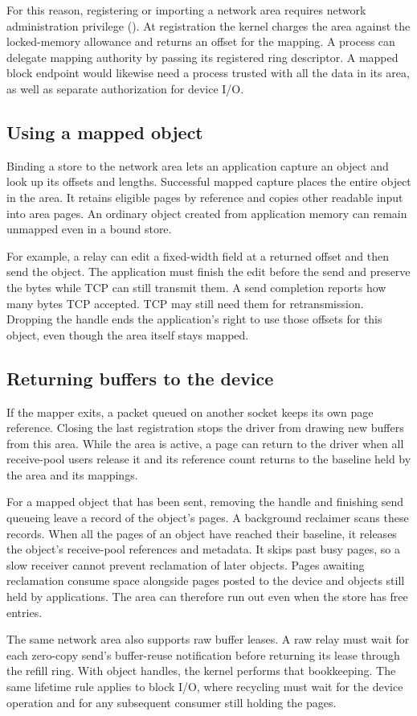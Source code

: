 For this reason, registering or importing a network area requires network
administration privilege (\capnetadmin). At registration the kernel charges the
area against the locked-memory allowance and returns an offset for the mapping.
A process can delegate mapping authority by passing its registered ring
descriptor. A mapped block endpoint would likewise need a process trusted
with all the data in its area, as well as separate authorization for device I/O.

\subsection{Using a mapped object}
\label{sec:mapped:objects}

Binding a store to the network area lets an application capture an object
and look up its offsets and lengths. Successful mapped capture places the
entire object in the area. It retains eligible pages by reference and copies
other readable input into area pages. An ordinary object created from
application memory can remain unmapped even in a bound store.

For example, a relay can edit a fixed-width field at a returned offset and
then send the object. The application must finish the edit before the send
and preserve the bytes while TCP can still transmit them. A send completion
reports how many bytes TCP accepted. TCP may still need them for
retransmission. Dropping the handle ends the application's right to use
those offsets for this object, even though the area itself stays mapped.

\subsection{Returning buffers to the device}
\label{sec:mapped:recycle}

If the mapper exits, a packet queued on another socket keeps its own
page reference. Closing the last registration stops the driver from drawing new
buffers from this area. While the area is active, a page can return to the driver
when all receive-pool users release it and its reference count returns to the
baseline held by the area and its mappings.

For a mapped object that has been sent, removing the handle and finishing
send queueing leave a record of the object's pages. A background reclaimer
scans these records. When all the pages of an object have reached their
baseline, it releases the object's receive-pool references and metadata. It
skips past busy pages, so a slow receiver cannot prevent reclamation of later
objects. Pages awaiting reclamation consume space alongside pages posted to
the device and objects still held by applications. The area can therefore run
out even when the store has free entries.

The same network area also supports raw buffer leases. A raw relay must wait
for each zero-copy send's buffer-reuse notification before returning its
lease through the refill ring. With object handles, the kernel performs that
bookkeeping. The same lifetime rule applies to block I/O, where recycling must wait
for the device operation and for any subsequent consumer still holding the
pages.
